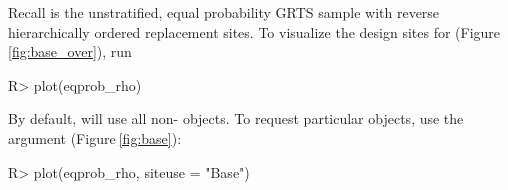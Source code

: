 \documentclass[
  shortnames]{jss}
\begin{document}
Recall  is the unstratified, equal probability GRTS
sample with reverse hierarchically ordered replacement sites. To
visualize the design sites for 
(Figure\(~\)\ref{fig:base_over}), run

\begin{CodeChunk}
\begin{CodeInput}
R> plot(eqprob_rho)
\end{CodeInput}
\end{CodeChunk}

By default,  will use all non- 
objects. To request particular  objects, use the
 argument (Figure\(~\)\ref{fig:base}):

\begin{CodeChunk}
\begin{CodeInput}
R> plot(eqprob_rho, siteuse = "Base")
\end{CodeInput}
\end{CodeChunk}
\end{document}
